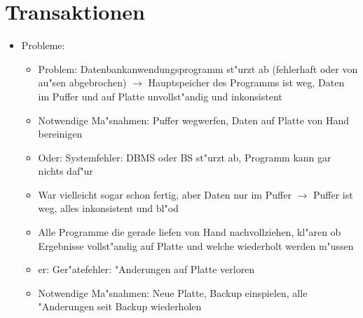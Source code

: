 \documentclass[a4paper, 12pt]{scrartcl}
\begin{document}
\section{Transaktionen}
\begin{itemize}
	\item
		Probleme:
		\begin{itemize}
			\item
				Problem: Datenbankanwendungsprogramm st"urzt ab (fehlerhaft oder von au"sen abgebrochen)  $\rightarrow$ Hauptspeicher des Programms ist weg, Daten im Puffer und auf Platte unvollst"andig und inkonsistent
			\item
				Notwendige Ma"snahmen: Puffer wegwerfen, Daten auf Platte von Hand bereinigen
			\item
				Oder: Systemfehler: DBMS oder BS st"urzt ab, Programm kann gar nichts daf"ur
			\item
				War vielleicht sogar schon fertig, aber Daten nur im Puffer $\rightarrow$  Puffer ist weg, alles inkonsistent und bl"od
			\item
				Alle Programme die gerade liefen von Hand nachvollziehen, kl"aren ob Ergebnisse vollst"andig auf Platte und welche wiederholt werden m"ussen
			\item
				er: Ger"atefehler: "Anderungen auf Platte verloren
			\item
				Notwendige Ma"snahmen: Neue Platte, Backup einspielen, alle "Anderungen seit Backup wiederholen


\end{itemize}
\end{itemize}
\end{document}

